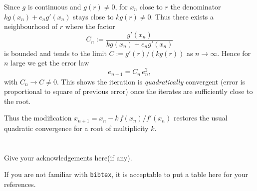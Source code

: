 \documentclass[a4paper]{article}
\begin{document}
Since $g$ is continuous and $g(r)\neq0$, for $x_n$ close to $r$ the
denominator $k g(x_n)+e_n g'(x_n)$ stays close to $k g(r)\neq0$. Thus
there exists a neighbourhood of $r$ where the factor
\[
C_n:=\frac{g'(x_n)}{k g(x_n) + e_n g'(x_n)}
\]
is bounded and tends to the limit $C:=g'(r)/(k g(r))$ as $n\to\infty$.
Hence for $n$ large we get the error law
\[
e_{n+1} = C_n\, e_n^2,
\]
with $C_n\to C\neq0$. This shows the iteration is \emph{quadratically}
convergent (error is proportional to square of previous error) once the
iterates are sufficiently close to the root.

Thus the modification $x_{n+1}=x_n-k\,f(x_n)/f'(x_n)$ restores the usual
quadratic convergence for a root of multiplicity $k$.






\section*{  }
Give your acknowledgements here(if any).


\printbibliography

If you are not familiar with \texttt{bibtex}, 
it is acceptable to put a table here for your references.
\end{document}
